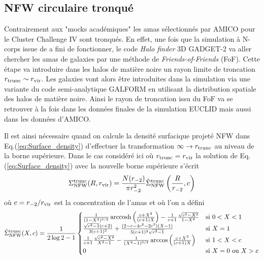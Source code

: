 \documentclass[a4paper,11pt]{article}
\numberwithin{equation}{section}
\DeclareMathOperator{\arccosh}{arccosh}
\begin{document}
  \subsection{NFW circulaire tronqué}
    Contrairement aux "mocks académiques" les amas sélectionnés par AMICO pour le Cluster Challenge IV sont tronqués. En effet, une fois que la simulation à N-corps issue de \cite{Springel2005} a fini de fonctionner, le code \textit{Halo finder} 3D GADGET-2 \cite{GADGET-2} va aller chercher les amas de galaxies par une méthode de \textit{Friends-of-Friends} (FoF). Cette étape va introduire dans les halos de matière noire un rayon limite de troncation $r_{\rm{trunc}} \sim r_{\rm{vir}}$. Les galaxies vont alors être introduites dans la simulation via une variante du code semi-analytique GALFORM \cite{GALFORM} en utilisant la distribution spatiale des halos de matière noire. Ainsi le rayon de troncation issu du FoF va se retrouver à la fois dans les données finales de la simulation EUCLID mais aussi dans les données d'AMICO. \par
  Il est ainsi nécessaire quand on calcule la densité surfacique projeté NFW dans Eq.(\ref{eq:Surface_density}) d'effectuer la transformation $\infty \rightarrow r_{\rm{trunc}}$ au niveau de la borne supérieure.\newline
    Dans le cas considéré ici où $r_{\rm{trunc}} = r_{\rm{vir}}$ la solution de Eq.(\ref{eq:Surface_density}) avec la nouvelle borne supérieure s'écrit \cite{Mamon2010}
    \begin{equation}
      \Sigma_{\rm{NFW}}^{\rm{trunc}} (R , r_{\rm{vir}}) = \frac{N(r_{-2})}{\pi r_{-2}^2} \tilde{\Sigma}_{\rm{NFW}}^{\rm{trunc}} \left ( \frac{R}{r_{-2}} , c \right )
    \end{equation}
    où $c = r_{-2}/r_{\rm{vir}}$ est la concentration de l'amas et où l'on a défini
    \begin{equation}
      \tilde{\Sigma}_{\rm{NFW}}^{\rm{trunc}} ( X, c) = \frac{1}{2 \log 2 - 1}
      \begin{cases}
        \frac{1}{(1-X^2)^{3/2}} \arccosh \left (\frac{c+X^2}{(c+1)X} \right ) - \frac{1}{c+1} \frac{\sqrt{c^2 - X^2}}{1-X^2} & \mbox{si } 0 < X < 1 \\
        \frac{\sqrt{c^2 -1} (c+2)}{3(c+1)^2} + \frac{(2 - c - 4 c^2 - 2 c^3)(X-1)}{5(c+1)^2 \sqrt{c^2 -1}} & \mbox{si } X = 1 \\
        \frac{1}{c+1} \frac{\sqrt{c^2 - X^2}}{X^2-1} - \frac{1}{(X^2-1)^{3/2}} \arccos \left (\frac{c+X^2}{(c+1)X} \right ) & \mbox{si } 1 < X < c \\
        0 & \mbox{si } X = 0 \mbox{ ou } X > c
      \end{cases}
    \end{equation}
    
\end{document}
